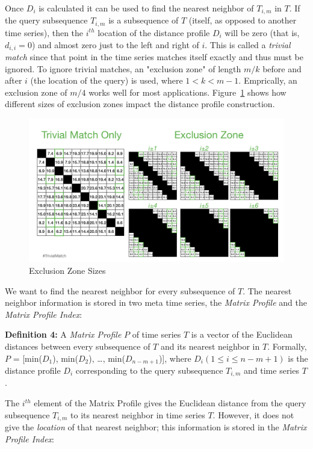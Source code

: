 \documentclass[conference]{IEEEtran}
\begin{document}
Once $D_i$ is calculated it can be used to find the nearest neighbor of $T_{i,m}$ in $T$.  If the query subsequence $T_{i,m}$ is a subsequence of $T$ (itself, as opposed to another time series), then the $i^{th}$ location of the distance profile $D_i$ will be zero (that is, $d_{i,i} = 0$) and almost zero just to the left and right of $i$.  This is called a \emph{trivial match} since that point in the time series matches itself exactly and thus must be ignored.  To ignore trivial matches, an "exclusion zone" of length $m/k$ before and after $i$ (the location of the query) is used, where $1 < k < m-1$.  Emprically, an exclusion zone of $m/4$ works well for most applications.  Figure~\ref{fig:ExclusionZone} shows how different sizes of exclusion zones impact the distance profile construction\cite{Stumpy}.

\begin{figure}
\begin{center}
\includegraphics[scale=0.25]{exclusion_zone.jpg}
\caption{Exclusion Zone Sizes}
\label{fig:ExclusionZone}
\end{center}
\end{figure}

We want to find the nearest neighbor for every subsequence of $T$.  The nearest neighbor information is stored in two meta time series, the \emph{Matrix Profile} and the \emph{Matrix Profile Index}:

\textbf{Definition 4:} A \emph{Matrix Profile} $P$ of time series $T$ is a vector of the Euclidean distances between every subsequence of $T$ and its nearest neighbor in $T$.  Formally, $P$ = [min($D_1$), min($D_2$), \ldots{}, min($D_{n-m+1}$)], where $D_i(1 \leq i \leq n-m+1)$ is the distance profile $D_i$ corresponding to the query subsequence $T_{i,m}$ and time series $T$.

The $i^{th}$ element of the Matrix Profile gives the Euclidean distance from the query subsequence $T_{i,m}$ to its nearest neighbor in time series $T$.  However, it does not give the \emph{location} of that nearest neighbor; this information is stored in the \emph{Matrix Profile Index}:
\end{document}
